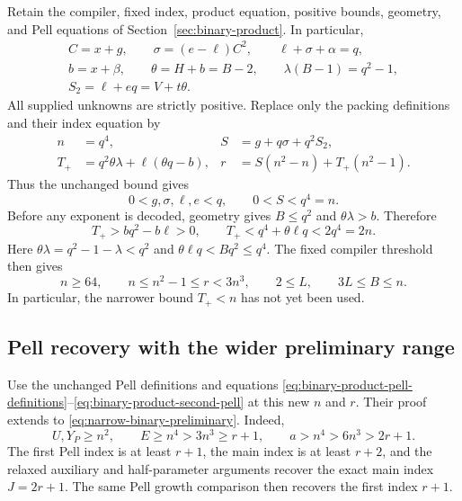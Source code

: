 Retain the compiler, fixed index, product equation, positive bounds,
geometry, and Pell equations of Section~\ref{sec:binary-product}.
In particular,
\begin{equation}\label{eq:narrow-binary-retained}
\begin{gathered}
 C=x+g,\qquad \sigma=(e-\ell)C^2,\qquad
 \ell+\sigma+\alpha=q,\\
 b=x+\beta,\qquad \theta=H+b=B-2,\qquad
 \lambda(B-1)=q^2-1,\\
 S_2=\ell+eq=V+t\theta.
\end{gathered}
\end{equation}
All supplied unknowns are strictly positive. Replace only the packing
definitions and their index equation by
\begin{equation}\label{eq:narrow-binary-packing}
\begin{aligned}
 n&=q^4, & S&=g+q\sigma+q^2S_2,\\
 T_+&=q^2\theta\lambda+\ell(\theta q-b), &
 r&=S(n^2-n)+T_+(n^2-1).
\end{aligned}
\end{equation}
Thus the unchanged bound gives
\[
 0<g,\sigma,\ell,e<q,\qquad 0<S<q^4=n.
\]
Before any exponent is decoded, geometry gives $B\le q^2$ and
$\theta\lambda>b$. Therefore
\[
 T_+>bq^2-b\ell>0,\qquad
 T_+<q^4+\theta\ell q<2q^4=2n.
\]
Here $\theta\lambda=q^2-1-\lambda<q^2$ and
$\theta\ell q<Bq^2\le q^4$. The fixed compiler threshold then gives
\begin{equation}\label{eq:narrow-binary-preliminary}
 n\ge64,\qquad n\le n^2-1\le r<3n^3,\qquad
 2\le L,\qquad 3L\le B\le n.
\end{equation}
In particular, the narrower bound $T_+<n$ has not yet been used.

\subsection{Pell recovery with the wider preliminary range}

Use the unchanged Pell definitions and equations
\eqref{eq:binary-product-pell-definitions}--\eqref{eq:binary-product-second-pell}
at this new $n$ and $r$. Their proof extends to
\eqref{eq:narrow-binary-preliminary}. Indeed,
\[
 U,Y_P\ge n^2,\qquad
 E\ge n^4>3n^3\ge r+1,\qquad
 a>n^4>6n^3>2r+1.
\]
The first Pell index is at least $r+1$, the main index is at least
$r+2$, and the relaxed auxiliary and half-parameter arguments recover
the exact main index $J=2r+1$. The same Pell growth comparison then
recovers the first index $r+1$.


